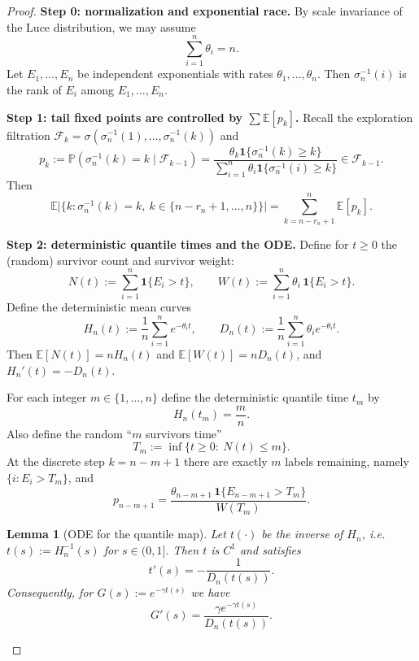 \documentclass[10pt]{article}
\newtheorem{lem}[thm]{Lemma}
\numberwithin{equation}{section}
\begin{document}
\begin{proof}
\textbf{Step 0: normalization and exponential race.}
By scale invariance of the Luce distribution, we may assume
\begin{equation}\label{eq:normalize-sumtheta}
\sum_{i=1}^n \theta_i = n.
\end{equation}
Let $E_1,\dots,E_n$ be independent exponentials with rates $\theta_1,\dots,\theta_n$.
Then $\sigma_n^{-1}(i)$ is the rank of $E_i$ among $E_1,\dots,E_n$.

\textbf{Step 1: tail fixed points are controlled by $\sum \mathbb E[p_k]$.}
Recall the exploration filtration $\mathcal F_k=\sigma(\sigma_n^{-1}(1),\dots,\sigma_n^{-1}(k))$ and
\[
p_k:=\mathbb P(\sigma_n^{-1}(k)=k\mid \mathcal F_{k-1})
=\frac{\theta_k \mathbf 1\{\sigma_n^{-1}(k)\ge k\}}{\sum_{i=1}^n \theta_i \mathbf 1\{\sigma_n^{-1}(i)\ge k\}}
\in \mathcal F_{k-1}.
\]
Then
\begin{equation}\label{eq:tail-exp-sum}
\mathbb E\Big|\{k:\sigma_n^{-1}(k)=k,\ k\in\{n-r_n+1,\dots,n\}\}\Big|
=\sum_{k=n-r_n+1}^{n}\mathbb E[p_k].
\end{equation}

\textbf{Step 2: deterministic quantile times and the ODE.}
Define for $t\ge0$ the (random) survivor count and survivor weight:
\[
N(t):=\sum_{i=1}^n \mathbf 1\{E_i>t\},\qquad
W(t):=\sum_{i=1}^n \theta_i\,\mathbf 1\{E_i>t\}.
\]
Define the deterministic mean curves
\begin{equation}\label{eq:HnDn-def}
H_n(t):=\frac1n\sum_{i=1}^n e^{-\theta_i t},\qquad
D_n(t):=\frac1n\sum_{i=1}^n \theta_i e^{-\theta_i t}.
\end{equation}
Then $\mathbb E[N(t)]=nH_n(t)$ and $\mathbb E[W(t)]=nD_n(t)$, and $H_n'(t)=-D_n(t)$.

For each integer $m\in\{1,\dots,n\}$ define the deterministic quantile time $t_m$ by
\begin{equation}\label{eq:tm-def}
H_n(t_m)=\frac{m}{n}.
\end{equation}
Also define the random ``$m$ survivors time''
\[
T_m:=\inf\{t\ge0:\ N(t)\le m\}.
\]
At the discrete step $k=n-m+1$ there are exactly $m$ labels remaining, namely $\{i:E_i>T_m\}$, and
\begin{equation}\label{eq:pk-Tm}
p_{n-m+1}
=\frac{\theta_{n-m+1}\,\mathbf 1\{E_{n-m+1}>T_m\}}{W(T_m)}.
\end{equation}

\begin{lem}[ODE for the quantile map]\label{lem:ode}
Let $t(\cdot)$ be the inverse of $H_n$, i.e.\ $t(s):=H_n^{-1}(s)$ for $s\in(0,1]$.
Then $t$ is $C^1$ and satisfies
\begin{equation}\label{eq:ode-t}
t'(s)=-\frac{1}{D_n(t(s))}.
\end{equation}
Consequently, for $G(s):=e^{-\gamma t(s)}$ we have
\begin{equation}\label{eq:ode-G}
G'(s)=\frac{\gamma e^{-\gamma t(s)}}{D_n(t(s))}.
\end{equation}
\end{lem}


\end{proof}
\end{document}
